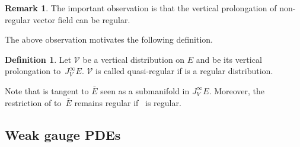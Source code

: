 \documentclass[pdftex]{sigma}
\numberwithin{equation}{section}
\theoremstyle{definition}
\newtheorem{Definition}[Theorem]{Definition}
\newtheorem{Remark}[Theorem]{Remark}
\renewcommand{\tilde}{\widetilde}
\newcommand{\vprol}{\tilde}
\begin{document}
\begin{Remark}
The important observation is that the vertical prolongation of non-regular vector field can be regular.
\end{Remark}
The above observation motivates the following definition.

\begin{Definition}
 Let $\mathcal{V}$ be a vertical distribution on $E$ and \smash{$\vprol{\mathcal{V}}$} be its vertical prolongation to~$J^{\infty}_VE$. $\mathcal{V}$ is called quasi-regular if \smash{$\vprol{\mathcal{V}}$} is a regular distribution.
\end{Definition}
Note that \smash{$\vprol{\mathcal{V}}$} is tangent to $\bar E$ seen as a submanifold in $J^{\infty}_VE$. Moreover, the restriction of \smash{$\vprol{\mathcal{V}}$} to~$\bar E$ remains regular if~\smash{$\vprol{\mathcal{V}}$} is regular.

\subsection{Weak gauge PDEs}
\end{document}
